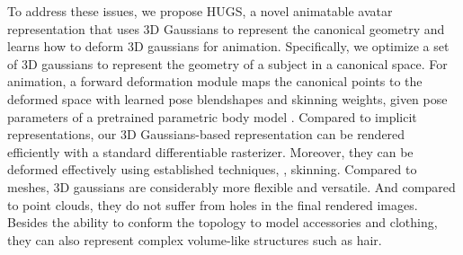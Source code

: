 To address these issues, we propose HUGS, a novel animatable avatar representation that uses 3D Gaussians to represent the canonical geometry and learns how to deform 3D gaussians for animation. Specifically, we optimize a set of 3D gaussians to represent the geometry of a subject in a canonical space. For animation, a forward deformation module maps the canonical points to the deformed space with learned pose blendshapes and skinning weights, given pose parameters of a pretrained parametric body model \ie \smpl. Compared to implicit representations, our 3D Gaussians-based representation can be rendered efficiently with a standard differentiable rasterizer. Moreover, they can be deformed effectively using established techniques, \eg, skinning. Compared to meshes, 3D gaussians are considerably more flexible and versatile. And compared to point clouds, they do not suffer from holes in the final rendered images. Besides the ability to conform the topology to model accessories and clothing, they can also represent complex volume-like structures such as hair.